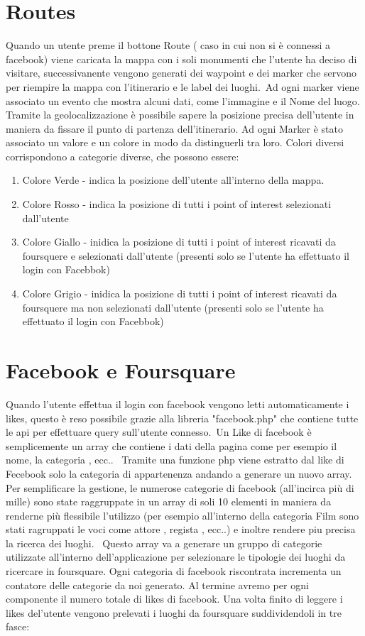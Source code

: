 \section{Routes}

Quando un utente preme il bottone Route ( caso in cui non si è connessi a facebook) viene caricata la mappa con i soli monumenti che l'utente ha deciso di visitare, successivanente vengono generati dei waypoint e dei marker che servono per riempire la mappa con l'itinerario e le label dei luoghi.\
Ad ogni marker viene associato un evento che mostra alcuni dati, come l'immagine e il Nome del luogo.
Tramite la geolocalizzazione è possibile sapere la posizione precisa dell'utente in maniera da fissare il punto di partenza dell'itinerario.
Ad ogni Marker è stato associato un valore e un colore in modo da distinguerli tra loro. 
Colori diversi corrispondono a categorie diverse, che possono essere:
\begin{enumerate}
\item Colore Verde - indica la posizione dell'utente all'interno della mappa.
\item Colore Rosso - indica la posizione di tutti i point of interest selezionati dall'utente 
\item Colore Giallo - inidica la posizione di tutti i point of interest ricavati da foursquere e selezionati dall'utente (presenti solo se l'utente ha effettuato il login con Facebbok)
\item Colore Grigio -  inidica la posizione di tutti i point of interest ricavati da foursquere ma non selezionati dall'utente  (presenti solo se l'utente ha effettuato il login con Facebbok)
\end{enumerate} 
\section{Facebook e Foursquare}

Quando l'utente effettua il login con facebook vengono letti automaticamente i likes, questo è reso possibile grazie alla libreria "facebook.php" che contiene tutte le api per effettuare query sull'utente connesso.\
Un Like di facebook è semplicemente un array che contiene i dati della pagina come per esempio il nome, la categoria , ecc.. \ Tramite una funzione php viene estratto dal like di Fecebook solo la categoria di appartenenza andando a generare un nuovo array.
Per semplificare la gestione, le numerose categorie di facebook (all'incirca più di mille) sono state raggruppate in un array di soli 10 elementi in maniera da renderne più flessibile l'utilizzo (per esempio all'interno della categoria Film sono stati ragruppati le voci come attore , regista , ecc..) e inoltre rendere piu precisa la ricerca dei luoghi. \
Questo array va a generare un gruppo di categorie utilizzate all'interno dell'applicazione per selezionare le tipologie dei luoghi da ricercare in foursquare.
Ogni categoria di facebook riscontrata incrementa un contatore delle categorie da noi generato. Al termine avremo per ogni componente il numero totale di likes di facebook.
Una volta finito di leggere i likes del'utente vengono prelevati i luoghi da foursquare suddividendoli in tre fasce:


